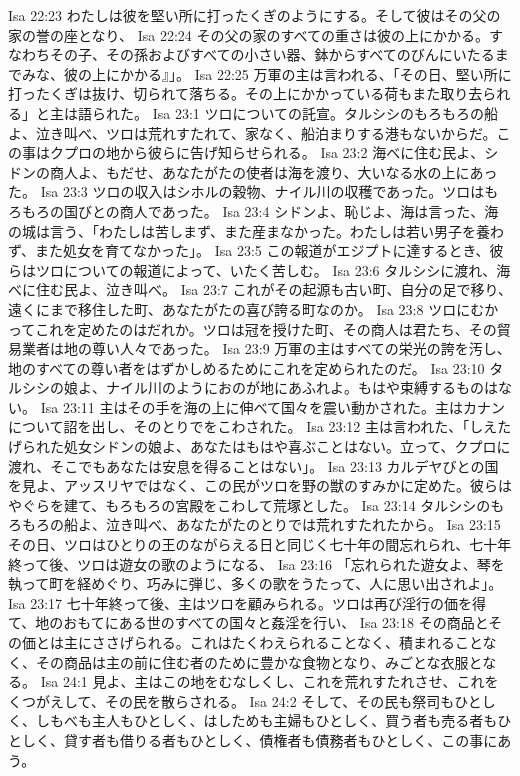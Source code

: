 Isa 22:23  わたしは彼を堅い所に打ったくぎのようにする。そして彼はその父の家の誉の座となり、
Isa 22:24  その父の家のすべての重さは彼の上にかかる。すなわちその子、その孫およびすべての小さい器、鉢からすべてのびんにいたるまでみな、彼の上にかかる』」。
Isa 22:25  万軍の主は言われる、「その日、堅い所に打ったくぎは抜け、切られて落ちる。その上にかかっている荷もまた取り去られる」と主は語られた。
Isa 23:1  ツロについての託宣。タルシシのもろもろの船よ、泣き叫べ、ツロは荒れすたれて、家なく、船泊まりする港もないからだ。この事はクプロの地から彼らに告げ知らせられる。
Isa 23:2  海べに住む民よ、シドンの商人よ、もだせ、あなたがたの使者は海を渡り、大いなる水の上にあった。
Isa 23:3  ツロの収入はシホルの穀物、ナイル川の収穫であった。ツロはもろもろの国びとの商人であった。
Isa 23:4  シドンよ、恥じよ、海は言った、海の城は言う、「わたしは苦しまず、また産まなかった。わたしは若い男子を養わず、また処女を育てなかった」。
Isa 23:5  この報道がエジプトに達するとき、彼らはツロについての報道によって、いたく苦しむ。
Isa 23:6  タルシシに渡れ、海べに住む民よ、泣き叫べ。
Isa 23:7  これがその起源も古い町、自分の足で移り、遠くにまで移住した町、あなたがたの喜び誇る町なのか。
Isa 23:8  ツロにむかってこれを定めたのはだれか。ツロは冠を授けた町、その商人は君たち、その貿易業者は地の尊い人々であった。
Isa 23:9  万軍の主はすべての栄光の誇を汚し、地のすべての尊い者をはずかしめるためにこれを定められたのだ。
Isa 23:10  タルシシの娘よ、ナイル川のようにおのが地にあふれよ。もはや束縛するものはない。
Isa 23:11  主はその手を海の上に伸べて国々を震い動かされた。主はカナンについて詔を出し、そのとりでをこわされた。
Isa 23:12  主は言われた、「しえたげられた処女シドンの娘よ、あなたはもはや喜ぶことはない。立って、クプロに渡れ、そこでもあなたは安息を得ることはない」。
Isa 23:13  カルデヤびとの国を見よ、アッスリヤではなく、この民がツロを野の獣のすみかに定めた。彼らはやぐらを建て、もろもろの宮殿をこわして荒塚とした。
Isa 23:14  タルシシのもろもろの船よ、泣き叫べ、あなたがたのとりでは荒れすたれたから。
Isa 23:15  その日、ツロはひとりの王のながらえる日と同じく七十年の間忘れられ、七十年終って後、ツロは遊女の歌のようになる、
Isa 23:16  「忘れられた遊女よ、琴を執って町を経めぐり、巧みに弾じ、多くの歌をうたって、人に思い出されよ」。
Isa 23:17  七十年終って後、主はツロを顧みられる。ツロは再び淫行の価を得て、地のおもてにある世のすべての国々と姦淫を行い、
Isa 23:18  その商品とその価とは主にささげられる。これはたくわえられることなく、積まれることなく、その商品は主の前に住む者のために豊かな食物となり、みごとな衣服となる。
Isa 24:1  見よ、主はこの地をむなしくし、これを荒れすたれさせ、これをくつがえして、その民を散らされる。
Isa 24:2  そして、その民も祭司もひとしく、しもべも主人もひとしく、はしためも主婦もひとしく、買う者も売る者もひとしく、貸す者も借りる者もひとしく、債権者も債務者もひとしく、この事にあう。
